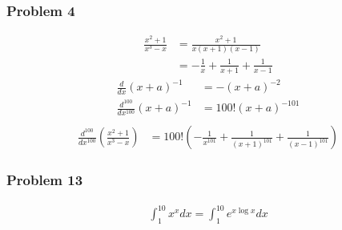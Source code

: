 \documentclass[10pt,a4paper]{book}
\theoremstyle{definition}
\begin{document}
\subsubsection{Problem 4}
\begin{align}
    \frac{x^2+1}{x^3-x}&=\frac{x^2+1}{x(x+1)(x-1)}\\
    &=-\frac{1}{x}+\frac{1}{x+1}+\frac{1}{x-1}
\end{align}
\begin{align}
    \frac{d}{dx}(x+a)^{-1}&=-(x+a)^{-2}\\
    \frac{d^{100}}{dx^{100}}(x+a)^{-1}&=100!(x+a)^{-101}\\
\end{align}
\begin{align}
    \frac{d^{100}}{dx^{100}}\left(\frac{x^2+1}{x^3-x}\right)&=100!\left(-\frac{1}{x^{101}}+\frac{1}{(x+1)^{101}}+\frac{1}{(x-1)^{101}}\right)
\end{align}

\subsubsection{Problem 13}
\begin{align}
    \int_1^{10} x^x dx=\int_1^{10} e^{x\log x} dx
\end{align}
\end{document}
